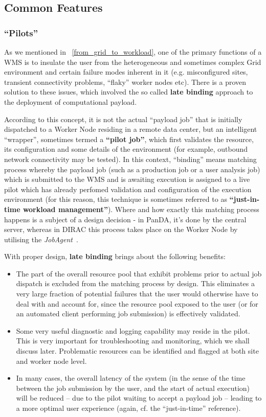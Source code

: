 \subsection{Common Features}

\subsubsection{``Pilots''}
As we mentioned in ~\ref{from_grid_to_workload}, one of the primary functions of a WMS is to insulate the user from the heterogeneous and sometimes complex
Grid environment and certain failure modes inherent in it (e.g. misconfigured sites, transient connectivity problems, ``flaky'' worker nodes etc).
There is a proven solution to these issues, which involved the so called \textbf{late binding} approach  to the deployment of computational payload.

According to this concept, it is not the actual ``payload job'' that is initially dispatched to a  Worker Node residing in a
remote data center, but an intelligent ``wrapper'', sometimes termed a \textbf{``pilot job''}, which first validates the resource, its configuration and
some details of the environment (for example, outbound network connectivity may be tested). In this context, ``binding'' means matching process
whereby the payload job (such as a production job or a user analysis job) which is submitted to the WMS and is awaiting execution is assigned to a
live pilot which has already perfomed validation and configuration of the execution environment (for this reason, this technique is sometimes referred
to as \textbf{``just-in-time workload management''}). Where and how exactly this matching process happens is a subject of a design decision - in PanDA, it's done by
the central server, whereas in DIRAC this process takes place on the Worker Node by utilising the \textit{JobAgent}~\cite{dirac_chep10}.

With proper design,\textbf{ late binding} brings about the following benefits:
\begin{itemize}
\item The part of the overall resource pool that exhibit problems prior to actual job dispatch is excluded from the matching process by design.
This eliminates a very large fraction of potential failures that the user would otherwise have to deal with and account for, since the resource pool
exposed to the user (or for an automated client performing job submission) is effectively validated.

\item Some very useful diagnostic and logging capability may reside in the pilot. This is very important for troubleshooting and monitoring, which we shall discuss later.
Problematic resources can be identified and flagged at both site and worker node level.

\item In many cases, the overall latency of the system (in the sense of the time between the job submission by the user, and the start of actual execution) will be reduced --
due to the pilot waiting to accept a payload job -- leading to a more optimal user experience (again, cf. the ``just-in-time'' reference).
\end{itemize}

